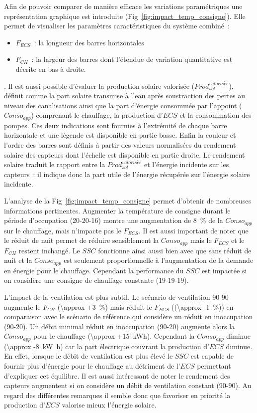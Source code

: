 Afin de pouvoir comparer de manière efficace les variations paramétriques une
représentation graphique est introduite (Fig~\ref{fig:impact_temp_consigne}). Elle permet
de visualiser les paramètres caractéristiques du système combiné~:
\begin{itemize}
    \item $F_{ECS}$~: la longueur des barres horizontales
    \item $F_{CH}$~: la largeur des barres dont l’étendue de variation quantitative
          est décrite en bas à droite.
\end{itemize}.
Il est aussi possible d’évaluer la production solaire valorisée
($Prod_{sol}^{valoris\acute ee}$), définit comme la part solaire transmise à l’eau après
soustraction des pertes au niveau des canalisations ainsi que la part d’énergie consommée
par l’appoint ($Conso_{app}$) comprenant le chauffage, la production d’$ECS$ et
la consommation des pompes. Ces deux indications sont fournies à l’extrémité de chaque
barre horizontale et une légende est disponible en partie basse.
Enfin la couleur et l’ordre des barres sont définis à partir des valeurs normalisées
du rendement solaire des capteurs dont l’échelle est disponible en partie droite. Le
rendement solaire traduit le rapport entre la $Prod_{sol}^{valoris\acute ee}$ et l’énergie
incidente sur les capteurs~: il indique donc la part utile de l’énergie récupérée sur
l’énergie solaire incidente.

L’analyse de la Fig~\ref{fig:impact_temp_consigne} permet d’obtenir de nombreuses
informations pertinentes. Augmenter la température de consigne durant le période
d’occupation (20-20-16) montre une augmentation de \SI{8}{\percent} de la $Conso_{app}$
sur le chauffage, mais n’impacte pas le $F_{ECS}$. Il est aussi important de noter que le
réduit de nuit permet de réduire sensiblement la $Conso_{app}$ mais le $F_{ECS}$ et le
$F_{CH}$ restent inchangé. Le $SSC$ fonctionne ainsi aussi bien avec que sans réduit de
nuit et la $Conso_{app}$ est seulement proportionnelle à l’augmentation de la demande en
énergie pour le chauffage. Cependant la performance du $SSC$ est impactée si on considère
une consigne de chauffage constante (19-19-19).

L’impact de la ventilation est plus subtil. Le scénario de ventilation 90-90
augmente le $F_{CH}$ (\SI{\approx +3}{\percent}) mais réduit le $F_{ECS}$
((\SI{\approx -1}{\percent})) en comparaison avec le scénario de référence qui considère un
réduit en inoccupation (90-20). Un débit minimal réduit en inoccupation (90-20) augmente
alors la $Conso_{app}$ pour le chauffage (\SI{\approx +15}{kWh}). Cependant la
$Conso_{app}$ diminue (\SI{\approx -8}{\kilo\watt\hour}) car la part
électrique couvrant la production d’$ECS$ diminue. En effet, lorsque le débit de ventilation
est plus élevé le $SSC$ est capable de fournir plus d’énergie pour le chauffage au
détriment de l’$ECS$ permettant d’expliquer cet équilibre. Il est aussi intéressant de noter le
rendement des capteurs augmentent si on considère un débit de ventilation constant
(90-90). Au regard des différentes remarques il semble donc que
favoriser en priorité la production d’$ECS$ valorise mieux l’énergie solaire.

